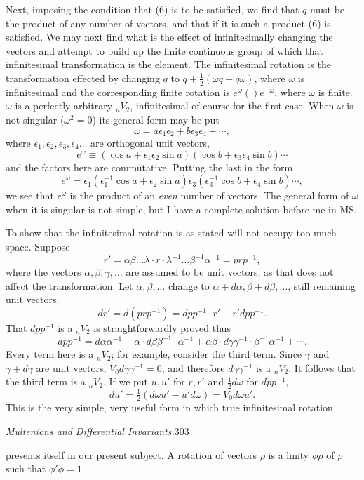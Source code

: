 \documentclass[11pt]{article}
\begin{document}
\indent Next, imposing the condition that (6) is to be satisfied, we find that $q$ must be the product of any number of vectors, and that if it is such a product (6) is satisfied. We may next find what is the effect of infinitesimally changing the vectors and attempt to build up the finite continuous group of which that infinitesimal transformation is the element. The infinitesimal rotation is the transformation effected by changing $q$ to $q+\tfrac12(\omega q-q\omega)$, where $\omega$ is infinitesimal and the corresponding finite rotation is $e^\omega()e^{-\omega}$, where $\omega$ is finite. $\omega$ is a perfectly arbitrary ${}_nV_2$, infinitesimal of course for the first case. When $\omega$ is not singular ($\omega^2=0$) its general form may be put
\[\omega=a\epsilon_1\epsilon_2+b\epsilon_3\epsilon_4+\cdots,\]
where $\epsilon_1,\epsilon_2,\epsilon_3,\epsilon_4\ldots$ are orthogonal unit vectors,
\[e^\omega\equiv(\cos a+\epsilon_1\epsilon_2\sin a)(\cos b+\epsilon_3\epsilon_4\sin b)\cdots\]
and the factors here are commutative. Putting the last in the form
\[e^\omega=\epsilon_1(\epsilon_1^{-1}\cos a+\epsilon_2\sin a)\epsilon_3(\epsilon_3^{-1}\cos b+\epsilon_4\sin b)\cdots,\]
we see that $e^\omega$ is the product of an \emph{even} number of vectors. The general form of $\omega$ when it is singular is not simple, but I have a complete solution before me in MS.

\indent To show that the infinitesimal rotation is as stated will not occupy too much space. Suppose
\[r'=\alpha\beta\ldots\lambda\cdot r\cdot\lambda^{-1}\ldots\beta^{-1}\alpha^{-1}=prp^{-1},\]
where the vectors $\alpha,\beta,\gamma,\ldots$ are assumed to be unit vectors, as that does not affect the transformation. Let $\alpha,\beta,\ldots$ change to $\alpha+d\alpha,\beta+d\beta,\ldots$, still remaining unit vectors.
\[dr'=d(prp^{-1})=dpp^{-1}\cdot r'-r'dpp^{-1}.\]
That $dpp^{-1}$ is a ${}_nV_2$ is straightforwardly proved thus
\[dpp^{-1}=d\alpha\alpha^{-1}+\alpha\cdot d\beta\beta^{-1}\cdot\alpha^{-1}+\alpha\beta\cdot d\gamma\gamma^{-1}\cdot\beta^{-1}\alpha^{-1}+\cdots.\]
Every term here is a ${}_nV_2$; for example, consider the third term. Since $\gamma$ and $\gamma+d\gamma$ are unit vectors, $V_0d\gamma\gamma^{-1}=0$, and therefore $d\gamma\gamma^{-1}$ is a ${}_nV_2$. It follows that the third term is a ${}_nV_2$. If we put $u,u'$ for $r,r'$ and $\tfrac12d\omega$ for $dpp^{-1}$,
\[du'=\tfrac12(d\omega u'-u'd\omega)=V_0d\omega u'.\]
This is the very simple, very useful form in which true infinitesimal rotation

\newpage\thispagestyle{empty}\begin{center}\textit{Multenions and Differential Invariants.}\hfill 303\end{center}
presents itself in our present subject. A rotation of vectors $\rho$ is a linity $\phi\rho$ of $\rho$ such that $\phi'\phi=1$.
\end{document}

